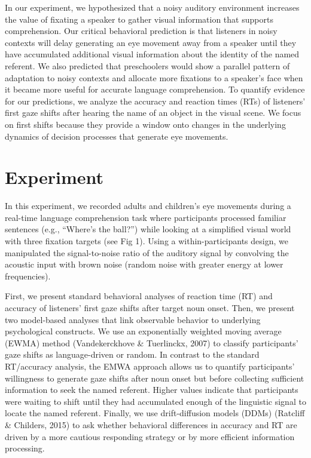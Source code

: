 \documentclass[10pt, letterpaper]{article}
\begin{document}
In our experiment, we hypothesized that a noisy auditory environment
increases the value of fixating a speaker to gather visual information
that supports comprehension. Our critical behavioral prediction is that
listeners in noisy contexts will delay generating an eye movement away
from a speaker until they have accumulated additional visual information
about the identity of the named referent. We also predicted that
preschoolers would show a parallel pattern of adaptation to noisy
contexts and allocate more fixations to a speaker's face when it became
more useful for accurate language comprehension. To quantify evidence
for our predictions, we analyze the accuracy and reaction times (RTs) of
listeners' first gaze shifts after hearing the name of an object in the
visual scene. We focus on first shifts because they provide a window
onto changes in the underlying dynamics of decision processes that
generate eye movements.

\section{Experiment}\label{experiment}

In this experiment, we recorded adults and children's eye movements
during a real-time language comprehension task where participants
processed familiar sentences (e.g., ``Where's the ball?'') while looking
at a simplified visual world with three fixation targets (see Fig 1).
Using a within-participants design, we manipulated the signal-to-noise
ratio of the auditory signal by convolving the acoustic input with brown
noise (random noise with greater energy at lower frequencies).

First, we present standard behavioral analyses of reaction time (RT) and
accuracy of listeners' first gaze shifts after target noun onset. Then,
we present two model-based analyses that link observable behavior to
underlying psychological constructs. We use an exponentially weighted
moving average (EWMA) method (Vandekerckhove \& Tuerlinckx, 2007) to
classify participants' gaze shifts as language-driven or random. In
contrast to the standard RT/accuracy analysis, the EMWA approach allows
us to quantify participants' willingness to generate gaze shifts after
noun onset but before collecting sufficient information to seek the
named referent. Higher values indicate that participants were waiting to
shift until they had accumulated enough of the linguistic signal to
locate the named referent. Finally, we use drift-diffusion models (DDMs)
(Ratcliff \& Childers, 2015) to ask whether behavioral differences in
accuracy and RT are driven by a more cautious responding strategy or by
more efficient information processing.
\end{document}
